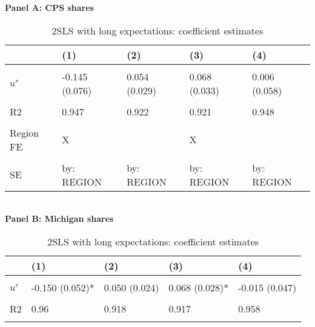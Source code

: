 \begin{table}[!htbp] \centering
\caption{2SLS with long expectations: coefficient estimates}
\label{tab:base:5only:2sls:stage2}
\textbf{Panel A: CPS shares} \\ 
\begin{tabular}{lllll}
\toprule
 & (1) & (2) & (3) & (4)\\
\midrule
\cellcolor{gray!10}{$p5^e$} & \cellcolor{gray!10}{-0.085 (0.054)} & \cellcolor{gray!10}{0.012 (0.014)} & \cellcolor{gray!10}{0.007 (0.014)} & \cellcolor{gray!10}{-0.071 (0.077)}\\
$u^r$ & -0.145 (0.076) & 0.054 (0.029) & 0.068 (0.033) & 0.006 (0.058)\\
\hline
\cellcolor{gray!10}{N} & \cellcolor{gray!10}{1,387} & \cellcolor{gray!10}{1,387} & \cellcolor{gray!10}{1,387} & \cellcolor{gray!10}{1,387}\\
R2 & 0.947 & 0.922 & 0.921 & 0.948\\
\cellcolor{gray!10}{within R2} & \cellcolor{gray!10}{0.483} & \cellcolor{gray!10}{} & \cellcolor{gray!10}{0.92} & \cellcolor{gray!10}{0.524}\\
\addlinespace
Region FE & X &  & X & \\
\cellcolor{gray!10}{Time FE} & \cellcolor{gray!10}{X} & \cellcolor{gray!10}{} & \cellcolor{gray!10}{} & \cellcolor{gray!10}{X}\\
SE & by: REGION & by: REGION & by: REGION & by: REGION\\
\bottomrule
\end{tabular} \vspace{5mm} 
\\ \textbf{Panel B: Michigan shares} \\ 
\begin{threeparttable}
\begin{tabular}{lllll}
\toprule
 & (1) & (2) & (3) & (4)\\
\midrule
\cellcolor{gray!10}{$p5^e$} & \cellcolor{gray!10}{0.018 (0.040)} & \cellcolor{gray!10}{-0.036 (0.011)**} & \cellcolor{gray!10}{-0.035 (0.011)**} & \cellcolor{gray!10}{0.021 (0.041)}\\
$u^r$ & -0.150 (0.052)* & 0.050 (0.024) & 0.068 (0.028)* & -0.015 (0.047)\\
\hline
\cellcolor{gray!10}{N} & \cellcolor{gray!10}{1,387} & \cellcolor{gray!10}{1,387} & \cellcolor{gray!10}{1,387} & \cellcolor{gray!10}{1,387}\\
R2 & 0.96 & 0.918 & 0.917 & 0.958\\
\cellcolor{gray!10}{within R2} & \cellcolor{gray!10}{0.609} & \cellcolor{gray!10}{} & \cellcolor{gray!10}{0.916} & \cellcolor{gray!10}{0.612}\\

\end{tabular}
\end{threeparttable}
\end{table}
